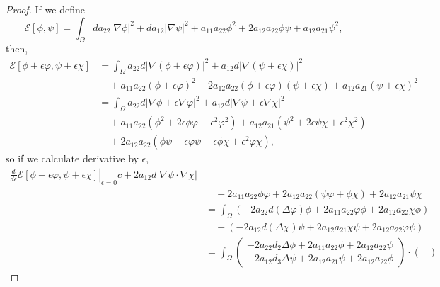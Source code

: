 \documentclass[11pt]{amsart}
\numberwithin{equation}{section}
\theoremstyle{plain}
\theoremstyle{definition}
\begin{document}
\begin{proof}
If we define
\begin{equation*}
	\mathcal{E}[\phi,\psi]=\int_{\Omega} da_{22}\lvert \nabla \phi \rvert^2+da_{12} \lvert \nabla \psi \rvert^2 +a_{11}a_{22} \phi^2+2a_{12}a_{22}\phi\psi+a_{12}a_{21} \psi^2,
\end{equation*}
then,
\begin{equation*}
	\begin{aligned}
\mathcal{E}[\phi + \epsilon \varphi, \psi + \epsilon \chi] 
&= \int_{\Omega} a_{22} d |\nabla(\phi + \epsilon \varphi)|^2 
+ a_{12} d |\nabla(\psi + \epsilon \chi)|^2 \\
&\quad + a_{11} a_{22} (\phi + \epsilon \varphi)^2 + 2 a_{12} a_{22} (\phi + \epsilon \varphi)(\psi + \epsilon \chi) + a_{12} a_{21} (\psi + \epsilon \chi)^2 \\
&= \int_{\Omega} a_{22} d |\nabla \phi + \epsilon \nabla \varphi|^2 + a_{12} d |\nabla \psi + \epsilon \nabla \chi|^2 \\
&\quad + a_{11} a_{22} (\phi^2 + 2\epsilon \phi \varphi + \epsilon^2 \varphi^2) + a_{12} a_{21} (\psi^2 + 2\epsilon \psi \chi + \epsilon^2 \chi^2) \\
&\quad +2a_{12} a_{22}(\phi \psi + \epsilon \varphi \psi + \epsilon \phi \chi + \epsilon^2\varphi \chi),
\end{aligned}
\end{equation*}
so if we calculate derivative by $\epsilon$,
\begin{equation*}
	\begin{aligned}
\left. \frac{d}{d\epsilon} \mathcal{E}[\phi + \epsilon \varphi, \psi + \epsilon \chi] \right|_{\epsilon=0}
c+ 2a_{12}d \lvert \nabla \psi \cdot \nabla \chi \rvert \\
&\quad + 2a_{11}a_{22}\phi\varphi + 2a_{12}a_{22}(\psi\varphi + \phi\chi) + 2a_{12}a_{21}\psi\chi \\
&= \int_{\Omega} (-2a_{22}d (\Delta \varphi) \phi + 2a_{11}a_{22} \varphi \phi + 2a_{12}a_{22}\chi \phi ) \\
&\quad + (-2a_{12}d (\Delta \chi) \psi  + 2a_{12}a_{21} \chi \psi + 2a_{12}a_{22}\varphi \psi ) \\
&= \int_{\Omega} 
\begin{pmatrix}
-2a_{22}d_2 \Delta \phi + 2a_{11}a_{22}\phi + 2a_{12}a_{22}\psi \\
-2a_{12}d_3 \Delta \psi + 2a_{12}a_{21}\psi + 2a_{12}a_{22}\phi
\end{pmatrix}
\cdot
\begin{pmatrix}

\end{pmatrix}
\end{aligned}
\end{equation*}
\end{proof}
\end{document}
